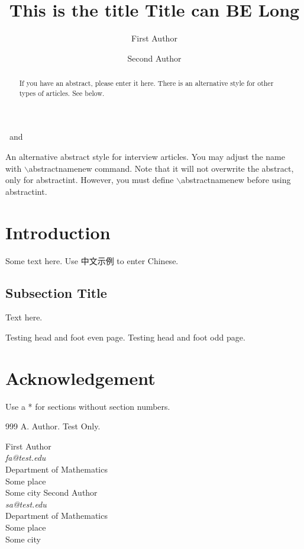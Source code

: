 \documentclass{iccm}
\def\textzh#1{{\textzhfamily #1}}%
\theoremstyle{plain}
\theoremstyle{definition}
\begin{document}
\begin{frontmatter}

\title{This is the title Title can BE Long}

\author{First Author}%
\ and %
\author{Second Author}%



\begin{abstract}
If you have an abstract, please enter it here. There is an alternative style for other types of articles. See below.
\end{abstract}

\def\abstractnamenew{Biography.}
\begin{abstractint}
An alternative abstract style for interview articles. You may adjust the name with $\backslash$abstractnamenew command. Note that it will not overwrite the abstract, only for abstractint. However, you must define $\backslash$abstractnamenew before using abstractint.
\end{abstractint}

\end{frontmatter}
%
\tableofcontents

 
\section{Introduction} \label{secIn}
Some text here. Use \textzh{中文示例} to enter Chinese.

\subsection{Subsection Title}
Text here. \cite{t1}

\newpage
Testing head and foot even page.
\newpage
Testing head and foot odd page.
\section*{Acknowledgement}
Use a * for sections without section numbers.


\begin{thebibliography}{999}
 A. Author. Test Only.
\end{thebibliography}

\begin{flushright}
First Author\\
{\it fa@test.edu}\\
Department of Mathematics\\
Some place\\
Some city
\vskip 0.5pc
Second Author\\
{\it sa@test.edu}\\
Department of Mathematics\\
Some place\\
Some city
\end{flushright}
\end{document}

